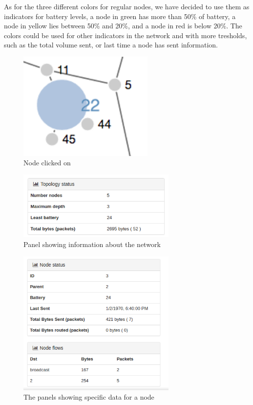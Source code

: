 As for the three different colors for regular nodes, we have decided to use them as indicators for battery levels, a node in green has more than 50\% of battery, a node in yellow lies between 50\% and 20\%, and a node in red is below 20\%. The colors could be used for other indicators in the network and with more tresholds, such as the total volume sent, or last time a node has sent information.\\

\begin{figure}
	\centering
	\includegraphics[width=0.6\textwidth]{res/snodeblue.png}
	\caption{Node clicked on}
	\label{fig:snodeblue}
\end{figure}

\begin{figure}
	\centering
	\includegraphics[width=0.7\textwidth]{res/topology_info.png}
	\caption{Panel showing information about the network}
	\label{fig:topo_info}
\end{figure}

\begin{figure}
	\centering
	\includegraphics[width=0.7\textwidth]{res/node_info.png}
	\caption{The panels showing specific data for a node}
	\label{fig:snode}
\end{figure}



